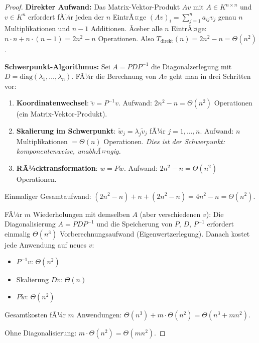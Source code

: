 ﻿\documentclass[a4paper,12pt]{report}
\theoremstyle{definition}
\begin{document}
\begin{proof}
    \textbf{Direkter Aufwand:} Das Matrix-Vektor-Produkt $Av$ mit
    $A \in K^{n \times n}$ und $v \in K^n$ erfordert fÃ¼r jeden
    der $n$ EintrÃ¤ge $(Av)_i = \sum_{j=1}^n a_{ij} v_j$ genau
    $n$ Multiplikationen und $n-1$ Additionen. Ãœber alle $n$ EintrÃ¤ge:
    $n \cdot n + n \cdot (n-1) = 2n^2 - n$ Operationen.
    Also $T_{\mathrm{direkt}}(n) = 2n^2 - n = \Theta(n^2)$.

    \textbf{Schwerpunkt-Algorithmus:} Sei $A = P D P^{-1}$ die
    Diagonalzerlegung mit $D = \mathrm{diag}(\lambda_1, \ldots, \lambda_n)$.
    FÃ¼r die Berechnung von $Av$ geht man in drei Schritten vor:

    \begin{enumerate}
        \item \textbf{Koordinatenwechsel}: $\tilde{v} = P^{-1} v$.
              Aufwand: $2n^2 - n = \Theta(n^2)$ Operationen
              (ein Matrix-Vektor-Produkt).
        \item \textbf{Skalierung im Schwerpunkt}: $\tilde{w}_j = \lambda_j \tilde{v}_j$
              fÃ¼r $j = 1, \ldots, n$.
              Aufwand: $n$ Multiplikationen $= \Theta(n)$ Operationen.
              \emph{Dies ist der Schwerpunkt: komponentenweise, unabhÃ¤ngig.}
        \item \textbf{RÃ¼cktransformation}: $w = P \tilde{w}$.
              Aufwand: $2n^2 - n = \Theta(n^2)$ Operationen.
    \end{enumerate}

    Einmaliger Gesamtaufwand: $(2n^2 - n) + n + (2n^2 - n) = 4n^2 - n = \Theta(n^2)$.

    FÃ¼r $m$ Wiederholungen mit demselben $A$ (aber verschiedenen $v$):
    Die Diagonalisierung $A = PDP^{-1}$ und die Speicherung von
    $P$, $D$, $P^{-1}$ erfordert einmalig $\Theta(n^3)$ Vorberechnungsaufwand
    (Eigenwertzerlegung). Danach kostet jede Anwendung auf neues $v$:
    \begin{itemize}
        \item[-] $P^{-1}v$: $\Theta(n^2)$
        \item[-] Skalierung $D\tilde{v}$: $\Theta(n)$
        \item[-] $P\tilde{w}$: $\Theta(n^2)$
    \end{itemize}
    Gesamtkosten fÃ¼r $m$ Anwendungen:
    $\Theta(n^3) + m \cdot \Theta(n^2) = \Theta(n^3 + mn^2)$.

    Ohne Diagonalisierung: $m \cdot \Theta(n^2) = \Theta(mn^2)$.


\end{proof}
\end{document}
